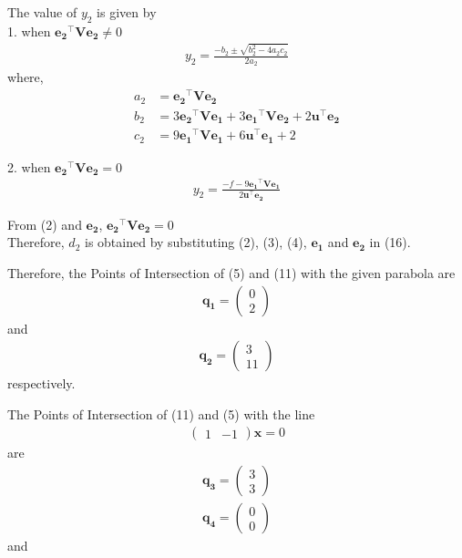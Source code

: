 \documentclass[journal,12pt,twocolumn]{IEEEtran}
\let\vec\mathbf
\begin{document}
\vspace{0.2cm}
The value of $y_2$ is given by \\
\vspace{0.2cm}
1. when $\vec{e_2}^{\top}\vec{V}\vec{e_2} \neq 0 $ 
\begin{align}
y_2=\frac{-b_2 \pm \sqrt{b_2^2-4a_2c_2}}{2a_2} 
\end{align}
where,
\begin{align*}
a_2 & = \vec{e_2}^{\top}\vec{V}\vec{e_2}\\
b_2 & = 3\vec{e_2}^{\top}\vec{V}\vec{e_1}+3\vec{e_1}^{\top}\vec{V}\vec{e_2}+2\vec{u}^{\top}\vec{e_2} \\
c_2 & = 9\vec{e_1}^{\top}\vec{V}\vec{e_1}+6\vec{u}^{\top}\vec{e_1}+2 
\end{align*}

\vspace{0.2cm}
2. when $\vec{e_2}^{\top}\vec{V}\vec{e_2} = 0 $ 
\begin{align}
y_2=\frac{-f-9\vec{e_1}^{\top}\vec{V}\vec{e_1}}{2\vec{u}^{\top}\vec{e_2}} 
\end{align} 

From (2) and $\vec{e_2}$, $\vec{e_2}^{\top}\vec{V}\vec{e_2} = 0 $\\
Therefore, $d_2$ is obtained by substituting (2), (3), (4), $\vec{e_1}$ and $\vec{e_2}$ in (16). 

\vspace{0.4cm}
Therefore, the Points of Intersection of (5) and (11) with the given parabola are
\begin{align}
\vec{q_1} = \begin{pmatrix}
 0\\
 2
\end{pmatrix} 
\end{align}
and 
\begin{align}
\vec{q_2} = \begin{pmatrix}
 3\\
 11
\end{pmatrix} 
\end{align}
respectively.

\vspace{0.2cm}
The Points of Intersection of (11) and (5) with the line
\begin{align}
\begin{pmatrix}
 1 & -1
\end{pmatrix} \vec{x} = 0
\end{align}  are
\begin{align}
\vec{q_3} = \begin{pmatrix}
 3\\
 3
\end{pmatrix} 
\end{align}
\begin{align}
\vec{q_4} = \begin{pmatrix}
 0\\
 0
\end{pmatrix} 
\end{align}
and
\end{document}
